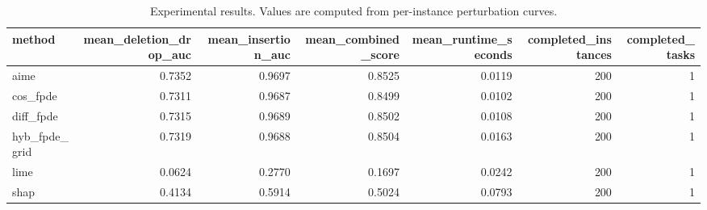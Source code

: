 \begin{table}[t]
\caption{Experimental results. Values are computed from per-instance perturbation curves.}
\label{tab:main_results_computed}
\centering
\begin{tabular}{lrrrrrr}
\toprule
method & mean\_deletion\_drop\_auc & mean\_insertion\_auc & mean\_combined\_score & mean\_runtime\_seconds & completed\_instances & completed\_tasks \\
\midrule
aime & 0.7352 & 0.9697 & 0.8525 & 0.0119 & 200 & 1 \\
cos\_fpde & 0.7311 & 0.9687 & 0.8499 & 0.0102 & 200 & 1 \\
diff\_fpde & 0.7315 & 0.9689 & 0.8502 & 0.0108 & 200 & 1 \\
hyb\_fpde\_grid & 0.7319 & 0.9688 & 0.8504 & 0.0163 & 200 & 1 \\
lime & 0.0624 & 0.2770 & 0.1697 & 0.0242 & 200 & 1 \\
shap & 0.4134 & 0.5914 & 0.5024 & 0.0793 & 200 & 1 \\
\bottomrule
\end{tabular}

\end{table}
